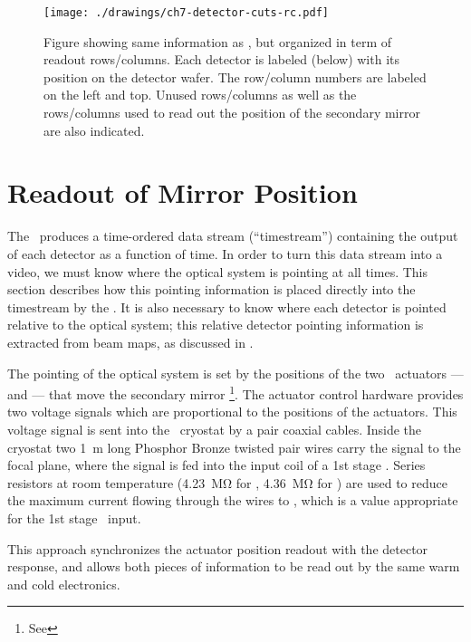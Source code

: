 \begin{figure}
\centering
\texttt{[image: ./drawings/ch7-detector-cuts-rc.pdf]}
\caption[Detector to multiplexing row/column mapping]{
  Figure showing same information as , but organized in term of readout rows/columns. Each detector is labeled (below) with its position on the detector wafer.
  The row/column numbers are labeled on the left and top. Unused rows/columns as well as the rows/columns used to read out the position of the secondary mirror are also indicated. }
\label{fig:detector-cuts-rc}
\end{figure}

\section{Readout of Mirror Position}\label{sec:ch7-mirror-readout}

The \Imager\ produces a time-ordered data stream (``timestream'') containing the output of each detector as a function of time.
In order to turn this data stream into a video, we must know where the optical system is pointing at all times.
This section describes how this pointing information is placed directly into the timestream by the \Imager.
It is also necessary to know where each detector is pointed relative to the optical system; this relative detector pointing information is extracted from beam maps, as discussed in .

The pointing of the optical system is set by the positions of the two \BOSE\ actuators ---  and  --- that move the secondary mirror%
\footnote{See }.
The actuator control hardware provides two voltage signals which are proportional to the positions of the actuators.
This voltage signal is sent into the \Imager\ cryostat by a pair coaxial cables.
Inside the cryostat two \SI{1}{m} long Phosphor Bronze  twisted pair wires carry the signal to the focal plane, where the signal is fed into the input coil of a 1st stage \SQUID.
Series resistors at room temperature (\SI{4.23}{\mega\ohm} for , \SI{4.36}{\mega\ohm} for ) are used to reduce the maximum current flowing through the wires to , which is a value appropriate for the 1st stage \SQUID\ input.

This approach synchronizes the actuator position readout with the detector response, and allows both pieces of information to be read out by the same warm and cold electronics.

